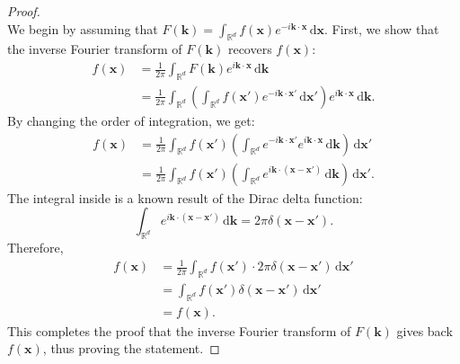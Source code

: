 \documentclass[a4paper,12pt]{article}
\begin{document}
\begin{proof}\mbox{}\\
We begin by assuming that \( F(\mathbf{k}) = \int_{\mathbb{R}^d} f(\mathbf{x}) e^{-i \mathbf{k} \cdot \mathbf{x}} \, \mathrm{d}\mathbf{x} \).
First, we show that the inverse Fourier transform of \( F(\mathbf{k}) \) recovers \( f(\mathbf{x}) \):
\[\begin{aligned}
f(\mathbf{x}) &= \frac{1}{2\pi} \int_{\mathbb{R}^d} F(\mathbf{k}) e^{i \mathbf{k} \cdot \mathbf{x}} \, \mathrm{d}\mathbf{k} \\
&= \frac{1}{2\pi} \int_{\mathbb{R}^d} \left( \int_{\mathbb{R}^d} f(\mathbf{x}') e^{-i \mathbf{k} \cdot \mathbf{x}'} \, \mathrm{d}\mathbf{x}' \right) e^{i \mathbf{k} \cdot \mathbf{x}} \, \mathrm{d}\mathbf{k}.
\end{aligned}\]
By changing the order of integration, we get:
\[\begin{aligned}
f(\mathbf{x}) &= \frac{1}{2\pi} \int_{\mathbb{R}^d} f(\mathbf{x}') \left( \int_{\mathbb{R}^d} e^{-i \mathbf{k} \cdot \mathbf{x}'} e^{i \mathbf{k} \cdot \mathbf{x}} \, \mathrm{d}\mathbf{k} \right) \, \mathrm{d}\mathbf{x}' \\
&= \frac{1}{2\pi} \int_{\mathbb{R}^d} f(\mathbf{x}') \left( \int_{\mathbb{R}^d} e^{i \mathbf{k} \cdot (\mathbf{x} - \mathbf{x}')} \, \mathrm{d}\mathbf{k} \right) \, \mathrm{d}\mathbf{x}'.
\end{aligned}\]
The integral inside is a known result of the Dirac delta function:
\[
\int_{\mathbb{R}^d} e^{i \mathbf{k} \cdot (\mathbf{x} - \mathbf{x}')} \, \mathrm{d}\mathbf{k} = 2\pi \delta(\mathbf{x} - \mathbf{x}').
\]
Therefore,
\[\begin{aligned}
f(\mathbf{x}) &= \frac{1}{2\pi} \int_{\mathbb{R}^d} f(\mathbf{x}') \cdot 2\pi \delta(\mathbf{x} - \mathbf{x}') \, \mathrm{d}\mathbf{x}' \\
&= \int_{\mathbb{R}^d} f(\mathbf{x}') \delta(\mathbf{x} - \mathbf{x}') \, \mathrm{d}\mathbf{x}' \\
&= f(\mathbf{x}).
\end{aligned}\]
This completes the proof that the inverse Fourier transform of \( F(\mathbf{k}) \) gives back \( f(\mathbf{x}) \), thus proving the statement.
\end{proof}
\end{document}
